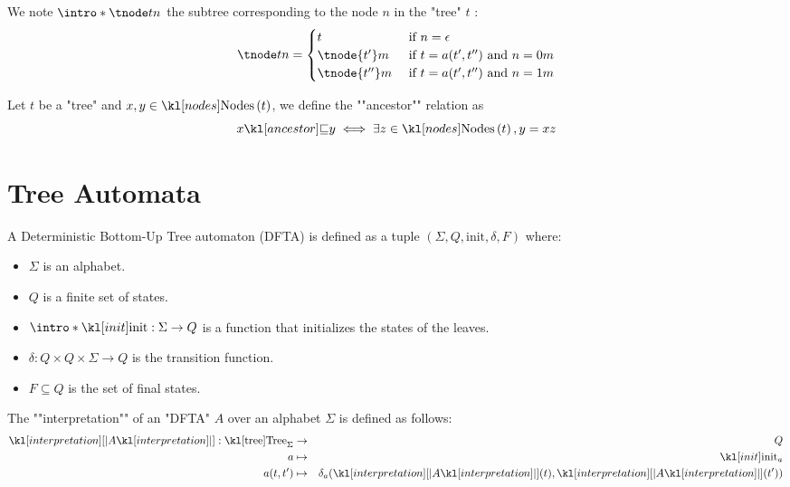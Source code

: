 \documentclass{article}
\begin{document}
\begin{definition}
	We note $\intro* \tnode t n$ the subtree corresponding to the node $n$ in the "tree" $t$ :
	\[
		\tnode t n =   \begin{cases}
			t              & \text{ if }  n = \epsilon                     \\
			\tnode {t'} m  & \text{ if } t = a(t',t'') \text{ and } n = 0m \\
			\tnode {t''} m & \text{ if } t = a(t',t'') \text{ and } n = 1m
		\end{cases}
	\]
\end{definition}

\begin{definition}
	Let $t$ be a "tree" and $x, y \in \nodes t$, we define the ""ancestor"" relation as
	\[ \ancestor x y \iff \exists z \in \nodes t, y = xz \]
\end{definition}

\section{Tree Automata}

\begin{definition}
	A Deterministic Bottom-Up Tree automaton (DFTA) is defined as a tuple $(\Sigma, Q, \text{init}, \delta, F)$ where:
	\begin{itemize}
		\item $\Sigma$ is an alphabet.
		\item $Q$ is a finite set of states.
		\item $\intro *\init : \Sigma \to Q$ is a function that initializes the states of the leaves.
		\item $\delta : Q \times Q \times \Sigma \to Q$ is the transition function.
		\item $F \subseteq Q$ is the set of final states.
	\end{itemize}
\end{definition}

\begin{definition}
	The ""interpretation"" of an "DFTA" $A$ over an alphabet $\Sigma$ is defined as follows:
	\begin{eqnarray*}
		\interpret A : \tree_{\Sigma} &\to& Q \\
		a &\mapsto& \init_a \\
		a(t,t') &\mapsto& \delta_a (\interpret A (t), \interpret A (t'))
	\end{eqnarray*}
\end{definition}
\end{document}
